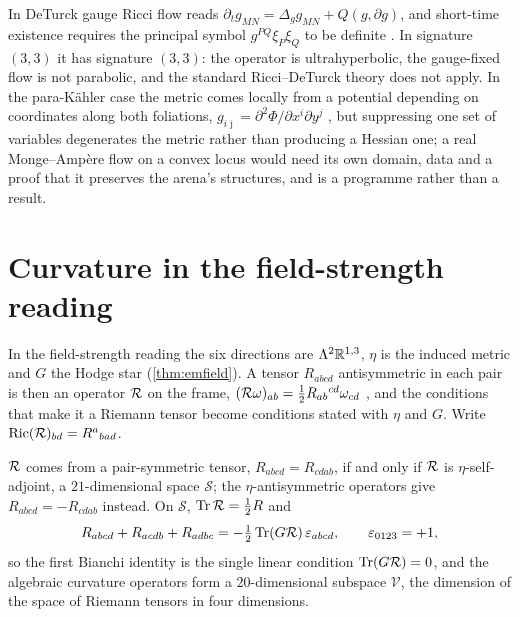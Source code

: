 In DeTurck gauge Ricci flow reads $\partial_tg_{MN}=\Delta_gg_{MN}+Q(g,\partial g)$, and short-time existence requires the principal symbol $g^{PQ}\xi_P\xi_Q$ to be
definite \cite{Hamilton82,DeTurck83}. In signature $(3,3)$ it has signature $(3,3)$: the operator is ultrahyperbolic, the gauge-fixed flow is not parabolic, and the
standard Ricci--DeTurck theory does not apply. In the para-K\"ahler case the metric comes locally from a potential depending on coordinates along both
foliations, $g_{i\bar\jmath}=\partial^2\Phi/\partial x^i\partial y^j$ \cite{Shima07}, but suppressing one set of variables degenerates the metric rather than producing a Hessian
one; a real Monge--Amp\`ere flow on a convex locus \cite{Cao85} would need its own domain, data and a proof that it preserves the arena's structures, and is a
programme rather than a result.



\section{Curvature in the field-strength reading}
\label{sec:curvop}

In the field-strength reading the six directions are $\Lambda^2\mathbb{R}^{1,3}$, $\eta$ is the induced metric and $G$ the Hodge star (\cref{thm:emfield}). A
tensor $R_{abcd}$ antisymmetric in each pair is then an operator $\mathcal R$ on the frame, $(\mathcal R\omega)_{ab}=\tfrac12R_{ab}{}^{cd}\omega_{cd}$ \cite{SingerThorpe69,Besse87},
and the conditions that make it a Riemann tensor become conditions stated with $\eta$ and $G$. Write $\operatorname{Ric}(\mathcal R)_{bd}=R^a{}_{bad}$.

\begin{proposition}
\label{prop:curvop}
$\mathcal R$ comes from a pair-symmetric tensor, $R_{abcd}=R_{cdab}$, if and only if $\mathcal R$ is $\eta$-self-adjoint, a $21$-dimensional space $\mathcal S$; the
$\eta$-antisymmetric operators give $R_{abcd}=-R_{cdab}$ instead. On $\mathcal S$, $\operatorname{Tr}\mathcal R=\tfrac12R$ and
\[
R_{abcd}+R_{acdb}+R_{adbc}=-\tfrac12\operatorname{Tr}(G\mathcal R)\,\varepsilon_{abcd},\qquad \varepsilon_{0123}=+1,
\]
so the first Bianchi identity is the single linear condition $\operatorname{Tr}(G\mathcal R)=0$, and the algebraic curvature operators form a $20$-dimensional subspace $\mathcal V$,
the dimension of the space of Riemann tensors in four dimensions.
\end{proposition}

